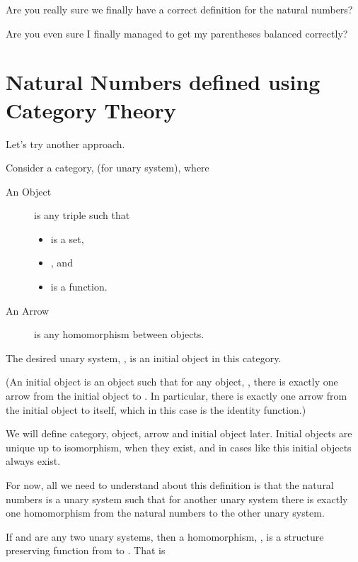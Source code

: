 \documentclass{seminar}
\newcommand{\NAT}{\textcolor{MathColor}{\ensuremath{\mathbb{N}}}}
\newcommand{\suc}{\tmi{succ}}
\begin{document}
\begin{slide}
\newslide

Are you really sure we finally have a correct definition
for the natural numbers?

Are you even sure I finally managed to get my parentheses
balanced correctly?

\newslide

\section{Natural Numbers defined using Category Theory}

Let's try another approach.

Consider a category,  (for unary system), where

\begin{description}
\item[An Object] is any triple  such that
\begin{itemize}
\item {} is a set,
\item {}, and
\item {} is a function.
\end{itemize}
\item[An Arrow] is any homomorphism between objects. 
\end{description}

The desired unary system,
\tm{(\NAT, 0, \suc)},
is an initial object in this category.

(An initial object is an object such that for any object, , there
is exactly one arrow from the initial object to .  In particular,
there is exactly one arrow from the initial object to itself, which in this case is the identity function.)

\newslide

We will define category, object, arrow and initial object later.
Initial objects are unique up to isomorphism, when they exist,
and in cases like this initial objects always exist.

For now, all we need to understand about this definition is that
the natural numbers is a unary system such that for another
unary system there is exactly one
homomorphism from the natural numbers to the other unary system.

If  and  are any two unary systems, then a homomorphism,
, is a structure preserving function from  to .  That is
\begin{codenott}
\\
\\
\end{codenott}


\end{slide}
\end{document}
